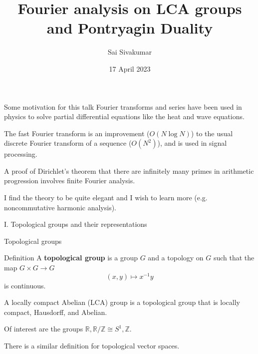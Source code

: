 \documentclass[mathserif
, handout
]{beamer}
\title
{\textcolor{black!85}{Fourier analysis on LCA groups and Pontryagin Duality}}
\author[Sai Sivakumar]{Sai Sivakumar}
\date{17 April 2023}
\begin{document}
\frame{\titlepage}

\begin{frame}{Some motivation for this talk}
    Fourier transforms and series have been used in physics to solve partial differential equations like the heat and wave equations. %
    \pause

    The fast Fourier transform is an improvement ($O(N\log N)$) to the usual discrete Fourier transform of a sequence ($O(N^2)$), and is used in signal processing. %
    \pause

    A proof of Dirichlet's theorem that there are infinitely many primes in arithmetic progression involves finite Fourier analysis.
    \pause

    I find the theory to be quite elegant and I wish to learn more (e.g. noncommutative harmonic analysis).
\end{frame}

\begin{frame}{}
    \begin{block}{}{
        \begin{center}\Large I. Topological groups and their representations\end{center}}
    \end{block}
\end{frame}

\begin{frame}{Topological groups}
    \begin{block}{Definition}
        A \textbf{topological group} is a group $G$ and a topology on $G$ such that the map $G\times G\to G$ \[(x,y)\mapsto x^{-1}y\] is continuous.
    \end{block} 
    \pause

    A locally compact Abelian (LCA) group is a topological group that is locally compact, Hausdorff, and Abelian.
    \pause

    Of interest are the groups $\mathbb{R}, \mathbb{R}/\mathbb{Z}\cong S^1, \mathbb{Z}$.
    \pause

    There is a similar definition for topological vector spaces.
\end{frame}
\end{document}
